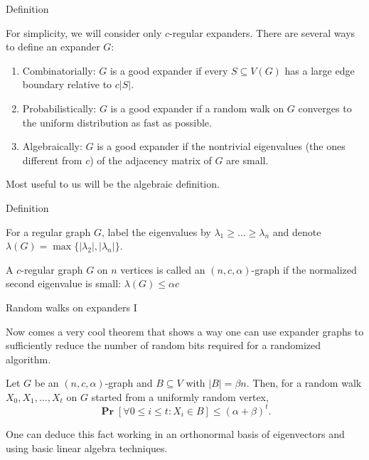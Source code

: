 \documentclass[10pt]{beamer}
\renewcommand{\P}{\operatorname*{\mathbf{Pr}}}
\renewcommand{\l}{\left}
\renewcommand{\r}{\right}
\renewcommand{\a}{\alpha}
\renewcommand{\b}{\beta}
\begin{document}
\begin{frame}{Definition}

  For simplicity, we will consider only $c$-regular expanders. There
  are several ways to define an expander $G$:
  \begin{enumerate}
  \item Combinatorially: $G$ is a good expander if every $S\subseteq
    V(G)$ has a large edge boundary relative to $c|S|$.
    \pause\bigskip\bigskip
  \item Probabilistically: $G$ is a good expander if a random walk on
    $G$ converges to the uniform distribution as fast as possible.
    \pause\bigskip\bigskip
  \item Algebraically: $G$ is a good expander if the nontrivial
    eigenvalues (the ones different from $c$) of the adjacency matrix
    of $G$ are small.
  \end{enumerate}

  \pause\bigskip\bigskip

  Most useful to us will be the algebraic definition.

\end{frame}

\begin{frame}{Definition}
  \begin{definition}
    For a regular graph $G$, label the eigenvalues by
    $\lambda_1\geq\ldots\geq\lambda_n$ and denote
    $\lambda(G)=\max\{|\lambda_2|,|\lambda_n|\}$.
  \end{definition}

  \pause\bigskip\bigskip

  \begin{definition}
    A $c$-regular graph $G$ on $n$ vertices is called an
    $(n,c,\a)$-graph if the normalized second eigenvalue is small:
    $\lambda(G)\leq \a c$
  \end{definition}

\end{frame}

\begin{frame}{Random walks on expanders I}

  Now comes a very cool theorem that shows a way one can use expander
  graphs to sufficiently reduce the number of random bits required for
  a randomized algorithm.

  \pause\bigskip

  \begin{theorem}
    Let $G$ be an $(n,c,\a)$-graph
    and $B\subseteq V$ with $|B|=\b n$. Then, for a random walk
    $X_0,X_1,\ldots,X_t$ on $G$ started from a uniformly random
    vertex,
    \[
    \P\l[\forall 0\leq i\leq t: X_i\in B\r]\leq (\a+\b)^t.
    \]
  \end{theorem}

  \pause\bigskip

  One can deduce this fact working in an orthonormal basis of
  eigenvectors and using basic linear algebra techniques.
\end{frame}
\end{document}
